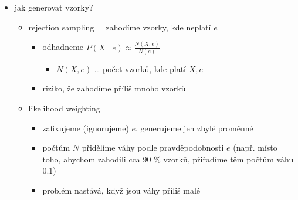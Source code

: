 \begin{itemize}
\begin{itemize}
\item jak generovat vzorky?
\begin{itemize}
\item rejection sampling = zahodíme vzorky, kde neplatí $e$
\begin{itemize}
\item odhadneme $P(X\mid e)\approx\frac{N(X,e)}{N(e)}$
\begin{itemize}
\item $N(X,e)$ \dots{} počet vzorků, kde platí $X,e$
\end{itemize}
\item riziko, že zahodíme příliš mnoho vzorků
\end{itemize}
\item likelihood weighting
\begin{itemize}
\item zafixujeme (ignorujeme) $e$, generujeme jen zbylé proměnné
\item počtům $N$ přidělíme váhy podle pravděpodobnosti $e$ (např. místo toho, abychom zahodili cca 90 \% vzorků, přiřadíme těm počtům váhu 0.1)
\item problém nastává, když jsou váhy příliš malé
\end{itemize}
\end{itemize}
\end{itemize}
\end{itemize}
